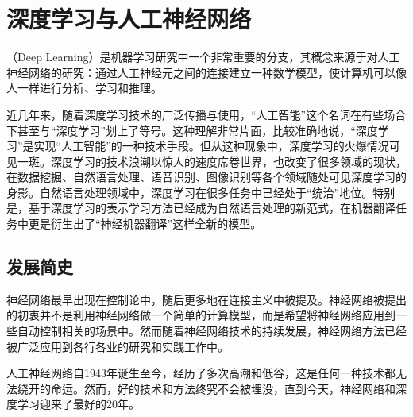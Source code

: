 
\section{深度学习与人工神经网络}

（Deep Learning）是机器学习研究中一个非常重要的分支，其概念来源于对人工神经网络的研究：通过人工神经元之间的连接建立一种数学模型，使计算机可以像人一样进行分析、学习和推理。

\parinterval 近几年来，随着深度学习技术的广泛传播与使用，``人工智能''这个名词在有些场合下甚至与``深度学习''划上了等号。这种理解非常片面，比较准确地说，``深度学习''是实现``人工智能''的一种技术手段。但从这种现象中，深度学习的火爆情况可见一斑。深度学习的技术浪潮以惊人的速度席卷世界，也改变了很多领域的现状，在数据挖掘、自然语言处理、语音识别、图像识别等各个领域随处可见深度学习的身影。自然语言处理领域中，深度学习在很多任务中已经处于``统治''地位。特别是，基于深度学习的表示学习方法已经成为自然语言处理的新范式，在机器翻译任务中更是衍生出了``神经机器翻译''这样全新的模型。


\subsection{发展简史}

\parinterval 神经网络最早出现在控制论中，随后更多地在连接主义中被提及。神经网络被提出的初衷并不是利用神经网络做一个简单的计算模型，而是希望将神经网络应用到一些自动控制相关的场景中。然而随着神经网络技术的持续发展，神经网络方法已经被广泛应用到各行各业的研究和实践工作中。

\parinterval 人工神经网络自1943年诞生至今，经历了多次高潮和低谷，这是任何一种技术都无法绕开的命运。然而，好的技术和方法终究不会被埋没，直到今天，神经网络和深度学习迎来了最好的20年。


